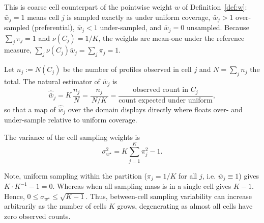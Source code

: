 This is coarse cell counterpart of the pointwise weight $w$ of
Definition~\ref{def:w}: $\bar w_j=1$ means cell $j$ is sampled exactly as
under uniform coverage, $\bar w_j>1$ over-sampled (preferential),
$\bar w_j<1$ under-sampled, and $\bar w_j=0$ unsampled. Because
$\sum_j\pi_j=1$ and $\nu(C_j)=1/K$, the weights are mean-one under the
reference measure, $\sum_j\nu(C_j)\bar w_j=\sum_j\pi_j=1$.

Let $n_j:=N(C_j)$ be the number of profiles observed in cell $j$ and
$N=\sum_j n_j$ the total. The natural estimator of $\bar w_j$ is
\begin{equation}
  \widehat{\bar w}_j=K\,\frac{n_j}{N}=\frac{n_j}{\,N/K\,}
  =\frac{\text{observed count in }C_j}{\text{count expected under uniform}} ,
  \label{eq:wbar-hat}
\end{equation}
so that a map of $\widehat{\bar w}_j$ over the domain displays directly
where floats over- and under-sample relative to uniform coverage.

\begin{lemma}
\label{lem:sigmawcell}
The variance of the cell sampling weights is
\[
  \sigma^2_{w^{\star}} = K\sum_{j=1}^{K}\pi_j^2-1 .
\]
\end{lemma}

Note, uniform sampling within the partition ($\pi_j=1/K$ for all $j$, i.e.
$\bar w_j\equiv1$) gives $K\cdot K^{-1}-1=0$.
Whereas when all sampling mass is in a single cell gives $K-1$.
Hence, $0\le\sigma_{w^{\star}}\le\sqrt{K-1}$.
Thus, between-cell sampling variability can increase arbitrarily as the number of cells $K$ grows, degenerating as almost all cells have zero observed counts.

